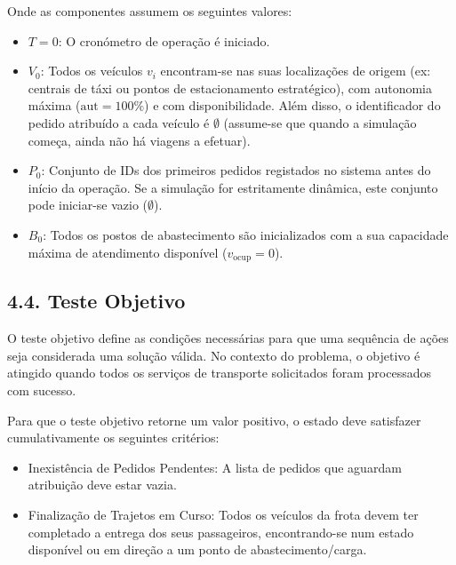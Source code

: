 \documentclass[a4paper]{article}
\begin{document}
\noindent Onde as componentes assumem os seguintes valores:

\begin{itemize}
    \item \( T = 0 \): O cronómetro de operação é iniciado.

    \item \( V_0 \): Todos os veículos \( v_i \) encontram-se nas suas localizações de origem (ex: centrais de táxi ou pontos de estacionamento estratégico), com autonomia máxima (\( \text{aut} = 100\% \)) e com disponibilidade. Além disso, o identificador do pedido atribuído a cada veículo é \( \emptyset \) (assume-se que quando a simulação começa, ainda não há viagens a efetuar).

    \item \( P_0 \): Conjunto de IDs dos primeiros pedidos registados no sistema antes do início da operação. Se a simulação for estritamente dinâmica, este conjunto pode iniciar-se vazio (\( \emptyset \)).

    \item \( B_0 \): Todos os postos de abastecimento são inicializados com a sua capacidade máxima de atendimento disponível (\( v_{\text{ocup}} = 0 \)).
\end{itemize}

\subsection*{4.4. Teste Objetivo}
\noindent O teste objetivo define as condições necessárias para que uma sequência de ações seja considerada uma solução válida. No contexto do problema, o objetivo é atingido quando todos os serviços de transporte solicitados foram processados com sucesso.

\vspace{0.5cm}

\noindent Para que o teste objetivo retorne um valor positivo, o estado deve satisfazer cumulativamente os seguintes critérios:

\begin{itemize}
    \item Inexistência de Pedidos Pendentes: A lista de pedidos que aguardam atribuição deve estar vazia.
    \item Finalização de Trajetos em Curso: Todos os veículos da frota devem ter completado a entrega dos seus passageiros, encontrando-se num estado disponível ou em direção a um ponto de abastecimento/carga.
\end{itemize}
\end{document}
